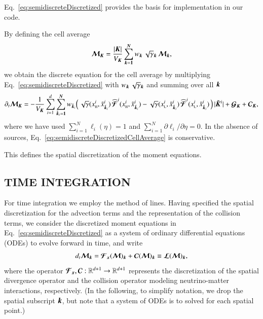 \documentclass[11pt,letterpaper,twoside,english,final]{article}
\begin{document}
Eq.~\eqref{eq:semidiscreteDiscretized} provides the basis for implementation in our code.  

By defining the cell average
\begin{equation}
  \boldsymbol{\mathcal{M}}_{\boldsymbol{K}}=\frac{|\boldsymbol{K}|}{V_{\boldsymbol{K}}}\sum_{\boldsymbol{k}=\boldsymbol{1}}^{\boldsymbol{N}}w_{\boldsymbol{k}}\,\sqrt{\gamma}_{\boldsymbol{k}}\,\boldsymbol{\mathcal{M}}_{\boldsymbol{k}},
  \label{eq:conservedCellAverage}
\end{equation}
we obtain the discrete equation for the cell average by multiplying Eq.~\eqref{eq:semidiscreteDiscretized} with $w_{\boldsymbol{k}}\,\sqrt{\gamma}_{\boldsymbol{k}}$ and summing over all $\boldsymbol{k}$
\begin{equation}
  \partial_{t}{\boldsymbol{\mathcal{M}}_{\boldsymbol{K}}}
  =-\frac{1}{V_{\boldsymbol{K}}}\sum_{i=1}^{d}\sum_{\tilde{\boldsymbol{k}}_{i}=\boldsymbol{1}}^{\boldsymbol{N}}w_{\tilde{\boldsymbol{k}}_{i}}
  \Big(\,
    \sqrt{\gamma}(x_{\mbox{\tiny H}}^{i},\tilde{x}_{\tilde{\boldsymbol{k}}_{i}}^{i})\,\widehat{\boldsymbol{\mathcal{F}}}^{i}(x_{\mbox{\tiny H}}^{i},\tilde{x}_{\tilde{\boldsymbol{k}}_{i}}^{i})
    -\sqrt{\gamma}(x_{\mbox{\tiny L}}^{i},\tilde{x}_{\tilde{\boldsymbol{k}}_{i}}^{i})\,\widehat{\boldsymbol{\mathcal{F}}}^{i}(x_{\mbox{\tiny L}}^{i},\tilde{x}_{\tilde{\boldsymbol{k}}_{i}}^{i})
  \,\Big)\,|\tilde{\boldsymbol{K}}^{i}|
  +\boldsymbol{\mathcal{G}}_{\boldsymbol{K}}+\boldsymbol{\mathcal{C}}_{\boldsymbol{K}},
  \label{eq:semidiscreteDiscretizedCellAverage}
\end{equation}
where we have used $\sum_{i=1}^{N}\ell_{i}(\eta)=1$ and $\sum_{i=1}^{N}\partial\ell_{i}/\partial\eta=0$.  
In the absence of sources, Eq.~\eqref{eq:semidiscreteDiscretizedCellAverage} is conservative.  

This defines the spatial discretization of the moment equations.  

\begin{center}
  \section{TIME INTEGRATION}
  \label{sec:timeIntegration}
\end{center}

For time integration we employ the method of lines.  
Having specified the spatial discretization for the advection terms and the representation of the collision terms, we consider the discretized moment equations in Eq.~\eqref{eq:semidiscreteDiscretized} as a system of ordinary differential equations (ODEs) to evolve forward in time, and write
\begin{equation}
  d_{t}\boldsymbol{\mathcal{M}}_{\boldsymbol{k}}
  =\boldsymbol{\mathcal{F}}_{\boldsymbol{x}}(\boldsymbol{\mathcal{M}})_{\boldsymbol{k}}+\boldsymbol{\mathcal{C}}(\boldsymbol{\mathcal{M}})_{\boldsymbol{k}}
  \equiv\boldsymbol{\mathcal{L}}(\boldsymbol{\mathcal{M}})_{\boldsymbol{k}},
  \label{eq:momentEquationsODEs}
\end{equation}
where the operator $\boldsymbol{\mathcal{F}}_{\boldsymbol{x}},\boldsymbol{\mathcal{C}}:\mathbb{R}^{d+1}\to\mathbb{R}^{d+1}$ represents the discretization of the spatial divergence operator and the collision operator modeling neutrino-matter interactions, respectively.  
(In the following, to simplify notation, we drop the spatial subscript $\boldsymbol{k}$, but note that a system of ODEs is to solved for each spatial point.)
\end{document}
